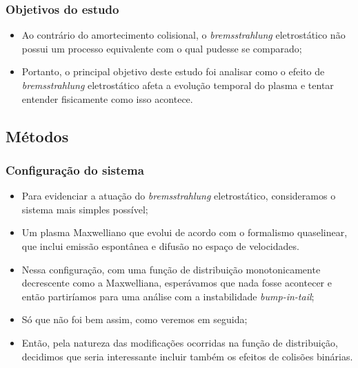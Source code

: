 \documentclass[10pt,aspectratio=1610,lualatex]{beamer}
\begin{document}
\begin{frame}
  \frametitle{Objetivos do estudo}
  \begin{itemize}
    \item Ao contrário do amortecimento colisional, o \emph{bremsstrahlung}
    eletrostático não possui um processo equivalente com o qual pudesse
    se comparado;
    \vspace{0.5cm}
    \item Portanto, o principal objetivo deste estudo foi analisar
    como o efeito de \emph{bremsstrahlung} eletrostático afeta a evolução
    temporal do plasma e tentar entender fisicamente como isso
    acontece.
  \end{itemize}
\end{frame}

\subsection*{Métodos}
\begin{frame}
  \frametitle{Configuração do sistema}
  \begin{itemize}
    \item Para evidenciar a atuação do \emph{bremsstrahlung} eletrostático,
    consideramos o sistema mais simples possível;
    \vspace{0.4cm}
    \pause
    \item Um plasma Maxwelliano que evolui de acordo com o formalismo
    quaselinear, que inclui emissão espontânea e difusão no espaço
    de velocidades.
    \vspace{0.4cm}
    \pause
    \item Nessa configuração, com uma função de distribuição monotonicamente
    decrescente como a Maxwelliana, esperávamos que nada fosse acontecer e
    então partiríamos para uma análise com a instabilidade \emph{bump-in-tail};
    \vspace{0.4cm}
    \pause
    \item Só que não foi bem assim, como veremos em seguida;
    \vspace{0.4cm}
    \pause
    \item Então, pela natureza das modificações ocorridas na função de
    distribuição, decidimos que seria interessante incluir também os
    efeitos de colisões binárias.
  \end{itemize}
\end{frame}
\end{document}
